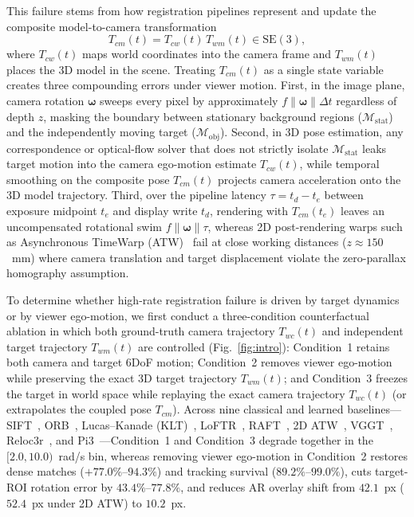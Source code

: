 \documentclass[journal]{IEEEtran}
\begin{document}
This failure stems from how registration pipelines represent and update the composite model-to-camera transformation
\begin{equation}
T_{cm}(t) = T_{cw}(t)\,T_{wm}(t) \in \mathrm{SE}(3),
\label{eq:comp}
\end{equation}
where $T_{cw}(t)$ maps world coordinates into the camera frame and $T_{wm}(t)$ places the 3D model in the scene. Treating $T_{cm}(t)$ as a single state variable creates three compounding errors under viewer motion. First, in the image plane, camera rotation $\boldsymbol{\omega}$ sweeps every pixel by approximately $f\|\boldsymbol{\omega}\|\Delta t$ regardless of depth $z$, masking the boundary between stationary background regions ($\mathcal{M}_{\text{stat}}$) and the independently moving target ($\mathcal{M}_{\text{obj}}$). Second, in 3D pose estimation, any correspondence or optical-flow solver that does not strictly isolate $\mathcal{M}_{\text{stat}}$ leaks target motion into the camera ego-motion estimate $T_{cw}(t)$, while temporal smoothing on the composite pose $T_{cm}(t)$ projects camera acceleration onto the 3D model trajectory. Third, over the pipeline latency $\tau = t_d - t_e$ between exposure midpoint $t_e$ and display write $t_d$, rendering with $T_{cm}(t_e)$ leaves an uncompensated rotational swim $f\|\boldsymbol{\omega}\|\tau$, whereas 2D post-rendering warps such as Asynchronous TimeWarp (ATW)~\cite{lincoln2016motion,lu2025quasar,gao2025xrgo} fail at close working distances ($z \approx 150$~mm) where camera translation and target displacement violate the zero-parallax homography assumption.

To determine whether high-rate registration failure is driven by target dynamics or by viewer ego-motion, we first conduct a three-condition counterfactual ablation in which both ground-truth camera trajectory $T_{wc}(t)$ and independent target trajectory $T_{wm}(t)$ are controlled (Fig.~\ref{fig:intro}): Condition~1 retains both camera and target 6DoF motion; Condition~2 removes viewer ego-motion while preserving the exact 3D target trajectory $T_{wm}(t)$; and Condition~3 freezes the target in world space while replaying the exact camera trajectory $T_{wc}(t)$ (or extrapolates the coupled pose $T_{cm}$). Across nine classical and learned baselines---SIFT~\cite{lowe2004distinctive}, ORB~\cite{rublee2011orb}, Lucas--Kanade (KLT)~\cite{lucas1981iterative}, LoFTR~\cite{sun2021loftr}, RAFT~\cite{teed2020raft}, 2D ATW~\cite{lu2025quasar}, VGGT~\cite{wang2025vggt}, Reloc3r~\cite{dong2025reloc3r}, and Pi3~\cite{wang2025pi3}---Condition~1 and Condition~3 degrade together in the $[2.0,10.0)$~rad/s bin, whereas removing viewer ego-motion in Condition~2 restores dense matches ($+77.0\%\text{--}94.3\%$) and tracking survival ($89.2\%\text{--}99.0\%$), cuts target-ROI rotation error by $43.4\%\text{--}77.8\%$, and reduces AR overlay shift from $42.1$~px ($52.4$~px under 2D ATW) to $10.2$~px.
\end{document}
